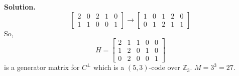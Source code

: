 \begin{exbox}
\begin{example}
    \textbf{Solution.}
    \[\begin{bmatrix}
            2 & 0 & 2 & 1 & 0 \\
            1 & 1 & 0 & 0 & 1
        \end{bmatrix}\rightarrow
        \begin{bmatrix}
            1 & 0 & 1 & 2 & 0 \\
            0 & 1 & 2 & 1 & 1
        \end{bmatrix}\]
    So,
    \[ H=
        \left[\begin{array}{cc|ccc}
                2 & 1 & 1 & 0 & 0 \\
                1 & 2 & 0 & 1 & 0 \\
                0 & 2 & 0 & 0 & 1
            \end{array}\right] \]
    is a generator matrix for $ C^{\perp} $ which is a $ (5,3) $-code
    over $ \mathbb{Z}_3 $. $ M=3^3=27 $.
        \end{example}
\end{exbox}
